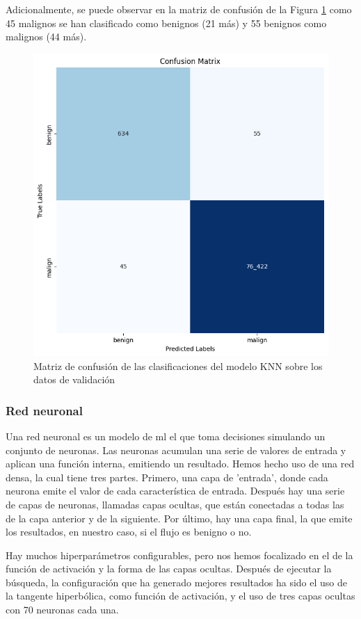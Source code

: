 Adicionalmente, se puede observar en la matriz de confusión de la Figura \ref{fig:knnmatrix} como 45 malignos se han clasificado como benignos (21 más) y 55 benignos como malignos (44 más).

\begin{figure}[H]
    \begin{center}
        \includegraphics[width=0.62\linewidth]{media/packet_pincer_train_models_KNN.png}
    \end{center}
    \caption{Matriz de confusión de las clasificaciones del modelo KNN sobre los datos de validación}\label{fig:knnmatrix}
\end{figure}

\subsubsection{Red neuronal}

Una red neuronal es un modelo de \gls{ml} el que toma decisiones simulando un conjunto de neuronas. Las neuronas acumulan una serie de valores de entrada y aplican una función interna, emitiendo un resultado. Hemos hecho uso de una red densa, la cual tiene tres partes. Primero, una capa de 'entrada', donde cada neurona emite el valor de cada característica de entrada. Después hay una serie de capas de neuronas, llamadas capas ocultas, que están conectadas a todas las de la capa anterior y de la siguiente. Por último, hay una capa final, la que emite los resultados, en nuestro caso, si el flujo es benigno o no.

Hay muchos hiperparámetros configurables, pero nos hemos focalizado en el de la función de activación y la forma de las capas ocultas. Después de ejecutar la búsqueda, la configuración que ha generado mejores resultados ha sido el uso de la tangente hiperbólica, como función de activación, y el uso de tres capas ocultas con 70 neuronas cada una.


